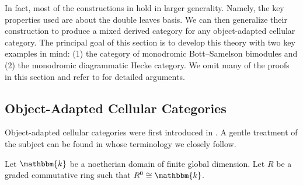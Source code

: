 \documentclass{amsart}
\renewcommand{\k}{\mathbbm{k}}
\theoremstyle{definition}
\numberwithin{equation}{subsection}
\begin{document}
In fact, most of the constructions in \cite{ARV} hold in larger generality. Namely, the key properties used are about the double leaves basis. 
We can then generalize their construction to produce a mixed derived category for any object-adapted cellular category.
The principal goal of this section is to develop this theory with two key examples in mind: (1) the category of monodromic Bott--Samelson bimodules and (2) the monodromic diagrammatic Hecke category.
We omit many of the proofs in this section and refer to \cite{ARV} for detailed arguments.

\subsection{Object-Adapted Cellular Categories}

Object-adapted cellular categories were first introduced in \cite{EL}. A gentle treatment of the subject can be found in \cite{EMTW} whose terminology we closely follow.

Let $\k$ be a noetherian domain of finite global dimension.
Let $R$ be a graded commutative ring such that $R^0 \cong \k$. 
\end{document}
